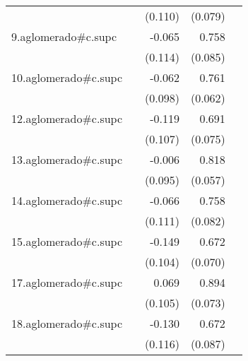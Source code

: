{\begin{longtable}{l*{4}{D{.}{.}{-1}}}
            &                     &     (0.110)         &     (0.079)         &                     \\
\addlinespace
9.aglomerado#c.supc&                     &      -0.065         &       0.758\sym{***}&                     \\
            &                     &     (0.114)         &     (0.085)         &                     \\
\addlinespace
10.aglomerado#c.supc&                     &      -0.062         &       0.761\sym{***}&                     \\
            &                     &     (0.098)         &     (0.062)         &                     \\
\addlinespace
12.aglomerado#c.supc&                     &      -0.119         &       0.691\sym{***}&                     \\
            &                     &     (0.107)         &     (0.075)         &                     \\
\addlinespace
13.aglomerado#c.supc&                     &      -0.006         &       0.818\sym{***}&                     \\
            &                     &     (0.095)         &     (0.057)         &                     \\
\addlinespace
14.aglomerado#c.supc&                     &      -0.066         &       0.758\sym{***}&                     \\
            &                     &     (0.111)         &     (0.082)         &                     \\
\addlinespace
15.aglomerado#c.supc&                     &      -0.149         &       0.672\sym{***}&                     \\
            &                     &     (0.104)         &     (0.070)         &                     \\
\addlinespace
17.aglomerado#c.supc&                     &       0.069         &       0.894\sym{***}&                     \\
            &                     &     (0.105)         &     (0.073)         &                     \\
\addlinespace
18.aglomerado#c.supc&                     &      -0.130         &       0.672\sym{***}&                     \\
            &                     &     (0.116)         &     (0.087)         &                     \\

\end{longtable}}
